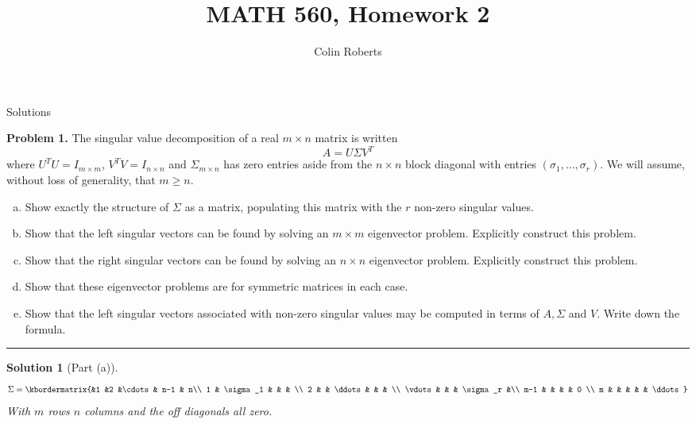 \documentclass[leqno]{article}
\author{Colin Roberts}
\title{MATH 560, Homework 2}
\theoremstyle{nonumberplain}
\newtheorem{solution}{Solution}
\begin{document}
\maketitle
\begin{large}
\begin{center}
Solutions
\end{center}
\end{large}
\pagebreak

\noindent\textbf{Problem 1.} The singular value decomposition of a real $m\times n$ matrix is written
\[
A=U\Sigma V^T
\] 
where $U^T U = I_{m\times m}$, $V^T V=I_{n\times n}$ and $\Sigma_{m\times n}$ has zero entries aside from the $n\times n$ block diagonal with entries $(\sigma_1,...,\sigma_r)$. We will assume, without loss of generality, that $m\geq n$. 

\begin{enumerate}[(a)]
\item Show exactly the structure of $\Sigma$ as a matrix, populating this matrix with the $r$ non-zero singular values.
\item Show that the left singular vectors can be found by solving an $m\times m$ eigenvector problem. Explicitly construct this problem.
\item Show that the right singular vectors can be found by solving an $n\times n$ eigenvector problem.  Explicitly construct this problem.
\item Show that these eigenvector problems are for symmetric matrices in each case.
\item Show that the left singular vectors associated with non-zero singular values may be computed in terms of $A,\Sigma$ and $V$. Write down the formula.
\end{enumerate}

\noindent\rule[0.5ex]{\linewidth}{1pt}

\begin{solution}[Part (a)]
\[
\Sigma = 
\kbordermatrix{&1 &2 &\cdots & n-1 & n\\
1 & \sigma_1 & & & \\
2 & & \ddots & & & \\
\vdots & & & \sigma_r &\\
m-1 & & & & 0 \\
m & & & & & \ddots
}
\]
With $m$ rows $n$ columns and the off diagonals all zero.
\end{solution}
\end{document}
